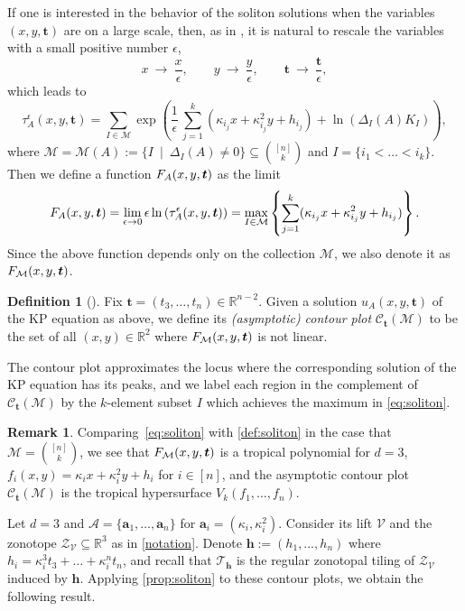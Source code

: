 \documentclass[11pt]{amsart}
\theoremstyle{plain}
\theoremstyle{definition}
\newtheorem{definition}[theorem]{Definition}
\newtheorem{remark}[theorem]{Remark}
\def\R{\mathbb{R}}
\def\t{{\bm{t}}}
\def\Pl{\Delta}
\def\V{\mathcal{V}}
\def\h{{\bm{h}}}
\def\a{{\bm{a}}}
\def\Zon{\mathcal{Z}}
\def\ZV{\Zon_\V}
\def\VC{\V}
\def\Tcal{\mathcal{T}}
\def\Tiling{\Tcal}
\let\subset\subseteq
\begin{document}
If one is interested in the behavior of the soliton solutions when the variables
$(x,y,\t)$ are on a large scale, then, as in \cite[Section 4.2]{KW2}, it is natural to 
 rescale the variables with a small positive number $\epsilon$,
\[
x~\longrightarrow ~\frac{x}{\epsilon},\qquad y~\longrightarrow~\frac{y}{\epsilon},\qquad
\t~\longrightarrow~\frac{\t}{\epsilon}, 
\]
which leads to
\[
\tau_A^{\epsilon}(x,y,\t)
=\sum_{I\in \mathcal{M}}
\exp\left(\frac{1}{\epsilon}\,\sum_{j=1}^k(\kappa_{i_j}x+\kappa_{i_j}^2y+h_{i_j})+\ln(\Pl_I(A)K_I)\right),
\]
where $\mathcal{M} = \mathcal{M}(A) := \{I \ \mid \ \Pl_I(A) \neq 0\} \subset {[n] \choose k}$ and $I=\{i_1<\dots< i_k\}$. 
Then we define a function $\FA(x,y,\t)$ as the limit
\begin{equation}\label{eq:soliton}
\FA(x,y,\t)=\displaystyle{\lim_{\epsilon\to 0}\epsilon\ln\left(\tau^{\epsilon}_A(x,y,\t)\right)}\\[1.5ex]
	=  \underset{I\in \mathcal{M}}\max \left\{
                     \sum_{j=1}^k (\kappa_{i_j} x + \kappa^2_{i_j} y +h_{i_j})\right\}.
\end{equation}
Since the above function depends only on the collection $\mathcal{M}$,
we also denote it as $\FM(x,y,\t)$.


\begin{definition}[\cite{KW, KW2}]\label{contour}
	Fix $\t = (t_3,\dots, t_n) \in \R^{n-2}$. 
  Given a solution $u_A(x,y,\t)$ of the KP equation as above,
	we define its \emph{(asymptotic) contour plot} 
	$\mathcal{C}_{\t}(\mathcal{M})$ to be the
	set of all $(x,y)\in\mathbb{R}^2$ where $\FM(x,y,\t)$ is not linear.  
\end{definition}

The contour plot approximates the locus where the corresponding solution 
of the KP equation has its peaks, and we label each region in 
the complement of 
 $\mathcal{C}_{\t}(\mathcal{M})$ by the $k$-element subset 
 $I$ which achieves the maximum in \eqref{eq:soliton}.

\begin{remark}\label{rem:soliton}
Comparing~\eqref{eq:soliton} with \cref{def:soliton} in the case that $\mathcal{M}={[n]\choose k}$, we see that $\FM(x,y,\t)$ 
is a tropical polynomial for $d=3$, $f_i(x,y) = \kappa_i x + \kappa_i^2 y + h_i$
for $i\in[n]$, and the asymptotic contour plot
$\mathcal{C}_{\t}(\mathcal{M})$ is the tropical hypersurface
$V_k(f_1,\dots,f_n)$.
\end{remark} 

Let $d=3$ and $\mathcal{A} = \{\a_1,\dots,\a_n\}$ for
	$\a_i = (\kappa_i,\kappa_i^2)$. Consider its lift $\VC$ and the zonotope $\ZV\subset\R^3$ as in \cref{notation}. Denote $\h:=(h_1,\dots,h_n)$ where $h_i = \kappa_i^3 t_3 + \dots + \kappa_i^n t_n$, and recall that $\Tiling_\h$ is the regular zonotopal tiling of $\ZV$ induced by $\h$. Applying \cref{prop:soliton} to these contour plots, we obtain the following result.
\end{document}

